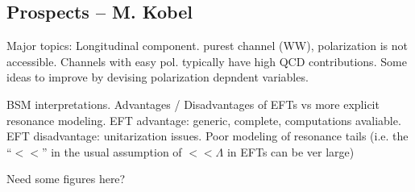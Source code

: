 \subsection{Prospects -- M. Kobel}

Major topics:
Longitudinal component.
purest channel (WW), polarization is not accessible. Channels with easy pol. typically have high QCD contributions.
Some ideas to improve by devising polarization depndent variables.

BSM interpretations.
Advantages / Disadvantages of EFTs vs more explicit resonance modeling.
EFT advantage: generic, complete, computations avaliable.
EFT disadvantage: unitarization issues. Poor modeling of resonance tails (i.e. the ``$<<$'' in the usual assumption of $<<\Lambda$ in EFTs can be ver large)

Need some figures here?
